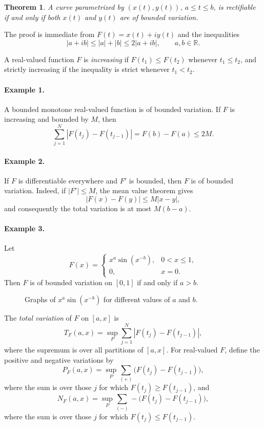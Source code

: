 \documentclass[11pt,openany]{book}
\newtheorem{theorem}{Theorem}[section]
\begin{document}
\begin{theorem}
A curve parametrized by $(x(t),y(t))$, $a\le t\le b$, is rectifiable if and only if both $x(t)$ and $y(t)$ are of bounded variation.
\end{theorem}

The proof is immediate from $F(t)=x(t)+iy(t)$ and the inequalities
\[
|a+ib|\le |a|+|b|\le2|a+ib|,
\qquad a,b\in\mathbb R.
\]

A real-valued function $F$ is \emph{increasing} if $F(t_1)\le F(t_2)$ whenever $t_1\le t_2$, and strictly increasing if the inequality is strict whenever $t_1<t_2$.

\paragraph{Example 1.}
A bounded monotone real-valued function is of bounded variation. If $F$ is increasing and bounded by $M$, then
\[
\sum_{j=1}^N|F(t_j)-F(t_{j-1})|
=F(b)-F(a)\le2M.
\]

\paragraph{Example 2.}
If $F$ is differentiable everywhere and $F'$ is bounded, then $F$ is of bounded variation. Indeed, if $|F'|\le M$, the mean value theorem gives
\[
|F(x)-F(y)|\le M|x-y|,
\]
and consequently the total variation is at most $M(b-a)$.

\paragraph{Example 3.}
Let
\[
F(x)=
\begin{cases}
x^a\sin(x^{-b}),&0<x\le1,\\
0,&x=0.
\end{cases}
\]
Then $F$ is of bounded variation on $[0,1]$ if and only if $a>b$.

\begin{figure}[ht]
\centering
{}
\caption{Graphs of $x^a\sin(x^{-b})$ for different values of $a$ and $b$.}
\end{figure}

The \emph{total variation} of $F$ on $[a,x]$ is
\[
T_F(a,x)=\sup_P\sum_{j=1}^N|F(t_j)-F(t_{j-1})|,
\]
where the supremum is over all partitions of $[a,x]$. For real-valued $F$, define the positive and negative variations by
\[
P_F(a,x)=\sup_P\sum_{(+)}\bigl(F(t_j)-F(t_{j-1})\bigr),
\]
where the sum is over those $j$ for which $F(t_j)\ge F(t_{j-1})$, and
\[
N_F(a,x)=\sup_P\sum_{(-)}-\bigl(F(t_j)-F(t_{j-1})\bigr),
\]
where the sum is over those $j$ for which $F(t_j)\le F(t_{j-1})$.
\end{document}
